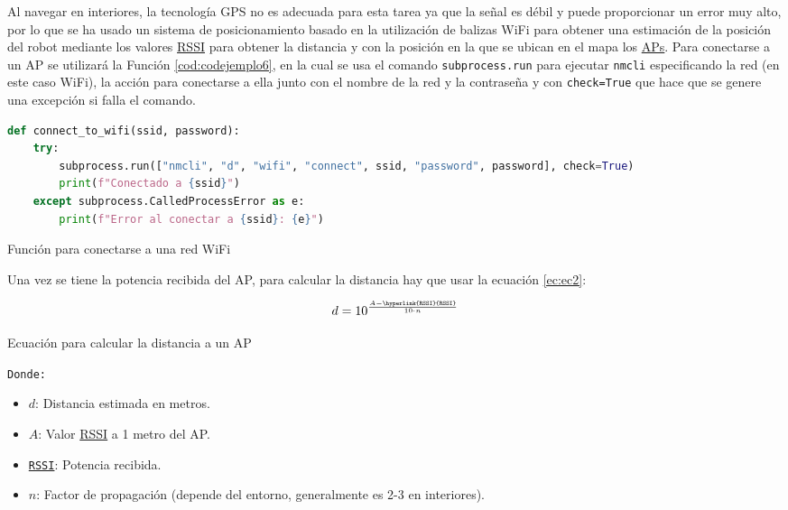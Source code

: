 Al navegar en interiores, la tecnología GPS no es adecuada para esta tarea ya que la señal es débil y puede proporcionar un error muy alto, por lo que se ha usado un sistema de posicionamiento basado en la utilización de balizas WiFi para obtener una estimación de la posición del robot mediante los valores \hyperlink{RSSI}{RSSI} para obtener la distancia y con la posición en la que se ubican en el mapa los \hyperlink{APs}{APs}. Para conectarse a un AP se utilizará la Función \ref{cod:codejemplo6}, en la cual se usa el comando \texttt{subprocess.run} para ejecutar \texttt{nmcli} especificando la red (en este caso WiFi), la acción para conectarse a ella junto con el nombre de la red y la contraseña y con \texttt{check=True} que hace que se genere una excepción si falla el comando.\\

\begin{code}[H]
\begin{lstlisting}[language=Python]
def connect_to_wifi(ssid, password):
    try:
        subprocess.run(["nmcli", "d", "wifi", "connect", ssid, "password", password], check=True)
        print(f"Conectado a {ssid}")
    except subprocess.CalledProcessError as e:
        print(f"Error al conectar a {ssid}: {e}")
\end{lstlisting}
\caption[Función para conectarse a una red WiFi]{Función para conectarse a una red WiFi}
\label{cod:codejemplo6}
\end{code}

Una vez se tiene la potencia recibida del AP, para calcular la distancia hay que usar la ecuación \ref{ec:ec2}:




\begin{myequation}[H]
\begin{equation}
d = 10^{\frac{A - \texttt{\hyperlink{RSSI}{RSSI}}}{10 \cdot n}}
\label{ec:ec2}
\end{equation}
\caption[Ecuación para calcular la distancia a un AP]{Ecuación para calcular la distancia a un AP}
\end{myequation} 
\texttt{Donde:}
\begin{itemize}
    \item $d$: Distancia estimada en metros.
    \item $A$: Valor \hyperlink{RSSI}{RSSI} a 1 metro del AP.
    \item \texttt{\hyperlink{RSSI}{RSSI}}: Potencia recibida.
    \item $n$: Factor de propagación (depende del entorno, generalmente es 2-3 en interiores).
\end{itemize}


